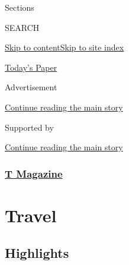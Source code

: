 Sections

SEARCH

\protect\hyperlink{site-content}{Skip to
content}\protect\hyperlink{site-index}{Skip to site index}

\href{https://myaccount.nytimes3xbfgragh.onion/auth/login?response_type=cookie\&client_id=vi}{}

\href{https://www.nytimes3xbfgragh.onion/section/todayspaper}{Today's
Paper}

Advertisement

\protect\hyperlink{after-top}{Continue reading the main story}

Supported by

\protect\hyperlink{after-sponsor}{Continue reading the main story}

\hypertarget{t-magazine}{%
\subsubsection{\texorpdfstring{\href{/section/t-magazine}{T
Magazine}}{T Magazine}}\label{t-magazine}}

\hypertarget{travel}{%
\section{Travel}\label{travel}}

\hypertarget{highlights}{%
\subsection{Highlights}\label{highlights}}

